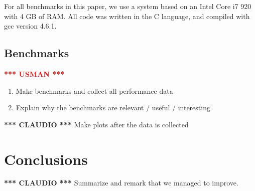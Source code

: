 \documentclass{article}
\newcommand{\usman}{\textcolor{Red}{\textbf{*** USMAN ***} }}
\newcommand{\claudio}{\textcolor{Cerulean}{\textbf{*** CLAUDIO ***} }}
\begin{document}
For all benchmarks in this paper, we use a system based on an Intel Core i7 920 with 4 GB of RAM.
All code was written in the C language, and compiled with gcc version 4.6.1.

\subsection{Benchmarks}
\usman
\begin{enumerate}
	\item Make benchmarks and collect all performance data
	\item Explain why the benchmarks are relevant / useful / interesting
\end{enumerate}
\claudio
Make plots after the data is collected


\section{Conclusions}
\claudio
Summarize and remark that we managed to improve.

\small



\end{document}
